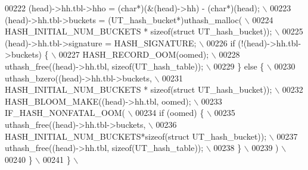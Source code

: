 \begin{DoxyCode}
{{{00222 \textcolor{preprocessor}{    (head)->hh.tbl->hho = (char*)(&(head)->hh) - (char*)(head);                  \(\backslash\)}
00223 \textcolor{preprocessor}{    (head)->hh.tbl->buckets = (UT\_hash\_bucket*)uthash\_malloc(                    \(\backslash\)}
00224 \textcolor{preprocessor}{        HASH\_INITIAL\_NUM\_BUCKETS * sizeof(struct UT\_hash\_bucket));               \(\backslash\)}
00225 \textcolor{preprocessor}{    (head)->hh.tbl->signature = HASH\_SIGNATURE;                                  \(\backslash\)}
00226 \textcolor{preprocessor}{    if (!(head)->hh.tbl->buckets) \{                                              \(\backslash\)}
00227 \textcolor{preprocessor}{      HASH\_RECORD\_OOM(oomed);                                                    \(\backslash\)}
00228 \textcolor{preprocessor}{      uthash\_free((head)->hh.tbl, sizeof(UT\_hash\_table));                        \(\backslash\)}
00229 \textcolor{preprocessor}{    \} else \{                                                                     \(\backslash\)}
00230 \textcolor{preprocessor}{      uthash\_bzero((head)->hh.tbl->buckets,                                      \(\backslash\)}
00231 \textcolor{preprocessor}{          HASH\_INITIAL\_NUM\_BUCKETS * sizeof(struct UT\_hash\_bucket));             \(\backslash\)}
00232 \textcolor{preprocessor}{      HASH\_BLOOM\_MAKE((head)->hh.tbl, oomed);                                    \(\backslash\)}
00233 \textcolor{preprocessor}{      IF\_HASH\_NONFATAL\_OOM(                                                      \(\backslash\)}
00234 \textcolor{preprocessor}{        if (oomed) \{                                                             \(\backslash\)}
00235 \textcolor{preprocessor}{          uthash\_free((head)->hh.tbl->buckets,                                   \(\backslash\)}
00236 \textcolor{preprocessor}{              HASH\_INITIAL\_NUM\_BUCKETS*sizeof(struct UT\_hash\_bucket));           \(\backslash\)}
00237 \textcolor{preprocessor}{          uthash\_free((head)->hh.tbl, sizeof(UT\_hash\_table));                    \(\backslash\)}
00238 \textcolor{preprocessor}{        \}                                                                        \(\backslash\)}
00239 \textcolor{preprocessor}{      )                                                                          \(\backslash\)}
00240 \textcolor{preprocessor}{    \}                                                                            \(\backslash\)}
00241 \textcolor{preprocessor}{  \}                                                                              \(\backslash\)}
}}}
\end{DoxyCode}
